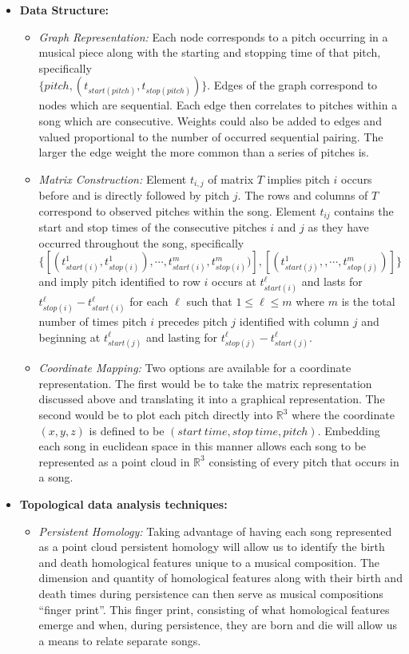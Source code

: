 \documentclass[11pt, a4paper]{article}
\begin{document}
\begin{enumerate}
\begin{itemize}
      
  \item \textbf{Data Structure:}
    \begin{itemize}
    \item \textit{Graph Representation:}  Each node corresponds to a pitch occurring in a musical piece along with the starting and stopping time of that pitch, specifically\\ $ \{ pitch, (t_{start(pitch)}, t_{stop(pitch)}) \} $. Edges of the graph correspond to nodes which are sequential. Each edge then correlates to pitches within a song which are consecutive. Weights could also be added to edges and valued proportional to the number of occurred sequential pairing. The larger the edge weight the more common than a series of pitches is.

    \item \textit{Matrix Construction:} Element $t_{i,j}$ of matrix $T$ implies pitch $i$ occurs before and is directly followed by pitch $j$. The rows and columns of $T$ correspond to observed pitches within the song. Element $t_{ij}$ contains the start and stop times of the consecutive pitches $i$ and $j$ as they have occurred throughout the song, specifically $\{[ (t^1_{start(i)}, t^1_{stop(i)}), \cdots ,t^m_{start(i)}, t^m_{stop(i)})]  , [(t^1_{start(j)}, , \cdots , t^m_{stop(j)})] \}$ and imply pitch identified to row $i$ occurs at $t^{\ell}_{start(i)}$ and lasts for  $ t^{\ell}_{stop(i)} - t^{\ell}_{start(i)}$ for each $\ell$ such that $1\leq \ell \leq m$ where $m$ is the total number of times pitch $i$ precedes pitch $j$ identified with column $j$ and beginning at $t^{\ell}_{start(j)}$ and lasting for $t^{\ell}_{stop(j)} - t^{\ell}_{start(j)}$.

    \item \textit{Coordinate Mapping:} Two options are available for a coordinate representation. The first would be to take the matrix representation discussed above and translating it into a graphical representation. The second would be to plot each pitch directly into $\mathbb{R}^3$ where the coordinate $(x,y,z)$ is defined to be $(start\ time, stop\ time, pitch)$. Embedding each song in euclidean space in this manner allows each song to be represented as a point cloud in $\mathbb{R}^3$ consisting of every pitch that occurs in a song. 
    \end{itemize}

    
  \item \textbf{Topological data analysis techniques:}
    
    \begin{itemize}
    \item \textit{Persistent Homology:} Taking advantage of having each song represented as a point cloud persistent homology will allow us to identify the birth and death homological features unique to a musical composition. The dimension and quantity of homological features along with their birth and death times during persistence can then serve as musical compositions ``finger print''. This finger print, consisting of what homological features emerge and when, during persistence, they are born and die will allow us a means to relate separate songs.


\end{itemize}
\end{itemize}
\end{enumerate}
\end{document}
